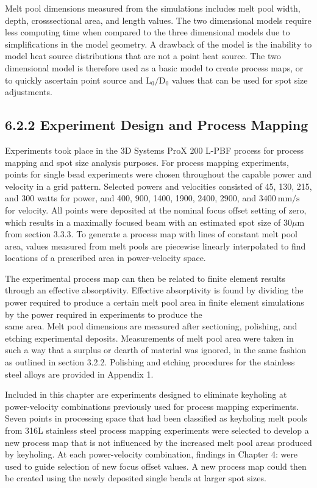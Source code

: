 \documentclass[10pt]{article}
\begin{document}
Melt pool dimensions measured from the simulations includes melt pool width, depth, crosssectional area, and length values. The two dimensional models require less computing time when compared to the three dimensional models due to simplifications in the model geometry. A drawback of the model is the inability to model heat source distributions that are not a point heat source. The two dimensional model is therefore used as a basic model to create process maps, or to quickly ascertain point source and $\mathrm{L}_{0} / \mathrm{D}_{0}$ values that can be used for spot size adjustments.

\subsection*{6.2.2 Experiment Design and Process Mapping}
Experiments took place in the 3D Systems ProX 200 L-PBF process for process mapping and spot size analysis purposes. For process mapping experiments, points for single bead experiments were chosen throughout the capable power and velocity in a grid pattern. Selected powers and velocities consisted of 45, 130, 215, and 300 watts for power, and 400, 900, 1400, 1900, 2400, 2900, and $3400 \mathrm{~mm} / \mathrm{s}$ for velocity. All points were deposited at the nominal focus offset setting of zero, which results in a maximally focused beam with an estimated spot size of $30 \mu \mathrm{m}$ from section 3.3.3. To generate a process map with lines of constant melt pool area, values measured from melt pools are piecewise linearly interpolated to find locations of a prescribed area in power-velocity space.

The experimental process map can then be related to finite element results through an effective absorptivity. Effective absorptivity is found by dividing the power required to produce a certain melt pool area in finite element simulations by the power required in experiments to produce the\\
same area. Melt pool dimensions are measured after sectioning, polishing, and etching experimental deposits. Measurements of melt pool area were taken in such a way that a surplus or dearth of material was ignored, in the same fashion as outlined in section 3.2.2. Polishing and etching procedures for the stainless steel alloys are provided in Appendix 1.

Included in this chapter are experiments designed to eliminate keyholing at power-velocity combinations previously used for process mapping experiments. Seven points in processing space that had been classified as keyholing melt pools from 316L stainless steel process mapping experiments were selected to develop a new process map that is not influenced by the increased melt pool areas produced by keyholing. At each power-velocity combination, findings in Chapter 4: were used to guide selection of new focus offset values. A new process map could then be created using the newly deposited single beads at larger spot sizes.
\end{document}
